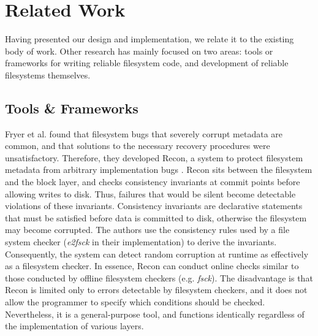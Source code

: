 \section{Related Work} \label{sec:related work}
Having presented our design and implementation, we relate it to the existing body of work.
Other research has mainly focused on two areas: tools or frameworks for writing reliable filesystem code, and development of reliable filesystems themselves.

\subsection{Tools \& Frameworks}\label{subsec:tools frameworks}
Fryer et al. found that filesystem bugs that severely corrupt metadata are common, and that solutions to the necessary recovery procedures were unsatisfactory.
Therefore, they developed Recon, a system to protect filesystem metadata from arbitrary implementation bugs \cite{fryer2012}.
Recon sits between the filesystem and the block layer, and checks consistency invariants at commit points before allowing writes to disk.
Thus, failures that would be silent become detectable violations of these invariants.
Consistency invariants are declarative statements that must be satisfied before data is committed to disk, otherwise the filesystem may become corrupted.
The authors use the consistency rules used by a file system checker (\textit{e2fsck} in their implementation) to derive the invariants.
Consequently, the system can detect random corruption at runtime as effectively as a filesystem checker.
In essence, Recon can conduct online checks similar to those conducted by offline filesystem checkers (e.g. \textit{fsck}).
The disadvantage is that Recon is limited only to errors detectable by filesystem checkers, and it does not allow the programmer to specify which conditions should be checked.
Nevertheless, it is a general-purpose tool, and functions identically regardless of the implementation of various layers.

